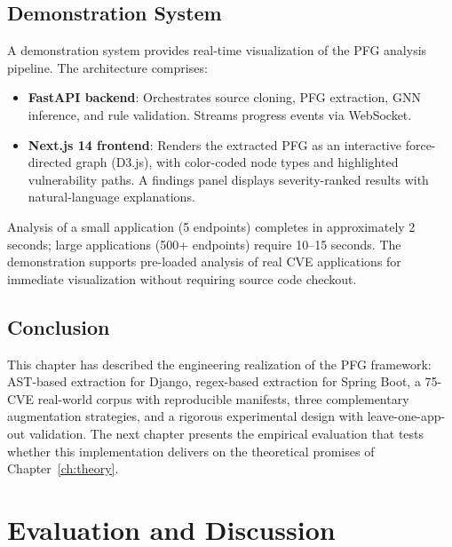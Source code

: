 \section{Demonstration System}
\label{sec:demo}

A demonstration system provides real-time visualization of the PFG analysis pipeline. The architecture comprises:

\begin{itemize}
    \item \textbf{FastAPI backend}: Orchestrates source cloning, PFG extraction, GNN inference, and rule validation. Streams progress events via WebSocket.
    \item \textbf{Next.js 14 frontend}: Renders the extracted PFG as an interactive force-directed graph (D3.js), with color-coded node types and highlighted vulnerability paths. A findings panel displays severity-ranked results with natural-language explanations.
\end{itemize}

Analysis of a small application (5 endpoints) completes in approximately 2 seconds; large applications (500+ endpoints) require 10--15 seconds. The demonstration supports pre-loaded analysis of real CVE applications for immediate visualization without requiring source code checkout.

\section{Conclusion}
\label{sec:ch4-conclusion}

This chapter has described the engineering realization of the PFG framework: AST-based extraction for Django, regex-based extraction for Spring Boot, a 75-CVE real-world corpus with reproducible manifests, three complementary augmentation strategies, and a rigorous experimental design with leave-one-app-out validation. The next chapter presents the empirical evaluation that tests whether this implementation delivers on the theoretical promises of Chapter~\ref{ch:theory}.



\chapter{Evaluation and Discussion}
\label{ch:evaluation}

